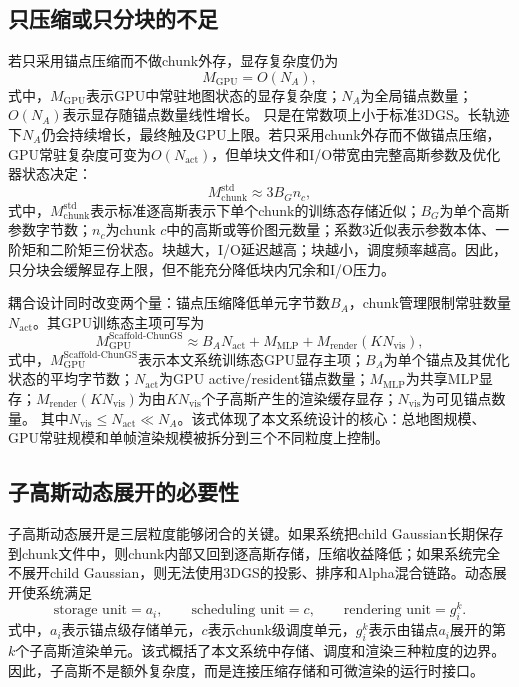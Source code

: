 \subsection{只压缩或只分块的不足}

若只采用锚点压缩而不做chunk外存，显存复杂度仍为
\begin{equation}
M_{\mathrm{GPU}}=O(N_A),
\end{equation}
式中，$M_{\mathrm{GPU}}$表示GPU中常驻地图状态的显存复杂度；$N_A$为全局锚点数量；$O(N_A)$表示显存随锚点数量线性增长。
只是在常数项上小于标准3DGS。长轨迹下$N_A$仍会持续增长，最终触及GPU上限。若只采用chunk外存而不做锚点压缩，GPU常驻复杂度可变为$O(N_{\mathrm{act}})$，但单块文件和I/O带宽由完整高斯参数及优化器状态决定：
\begin{equation}
M_{\mathrm{chunk}}^{\mathrm{std}}
\approx
3B_G n_c,
\end{equation}
式中，$M_{\mathrm{chunk}}^{\mathrm{std}}$表示标准逐高斯表示下单个chunk的训练态存储近似；$B_G$为单个高斯参数字节数；$n_c$为chunk $c$中的高斯或等价图元数量；系数3近似表示参数本体、一阶矩和二阶矩三份状态。块越大，I/O延迟越高；块越小，调度频率越高。因此，只分块会缓解显存上限，但不能充分降低块内冗余和I/O压力。

耦合设计同时改变两个量：锚点压缩降低单元字节数$B_A$，chunk管理限制常驻数量$N_{\mathrm{act}}$。其GPU训练态主项可写为
\begin{equation}
M_{\mathrm{GPU}}^{\mathrm{Scaffold\text{-}ChunGS}}
\approx
B_A N_{\mathrm{act}}
+
M_{\mathrm{MLP}}
+
M_{\mathrm{render}}(KN_{\mathrm{vis}}),
\end{equation}
式中，$M_{\mathrm{GPU}}^{\mathrm{Scaffold\text{-}ChunGS}}$表示本文系统训练态GPU显存主项；$B_A$为单个锚点及其优化状态的平均字节数；$N_{\mathrm{act}}$为GPU active/resident锚点数量；$M_{\mathrm{MLP}}$为共享MLP显存；$M_{\mathrm{render}}(KN_{\mathrm{vis}})$为由$K N_{\mathrm{vis}}$个子高斯产生的渲染缓存显存；$N_{\mathrm{vis}}$为可见锚点数量。
其中$N_{\mathrm{vis}}\leq N_{\mathrm{act}}\ll N_A$。该式体现了本文系统设计的核心：总地图规模、GPU常驻规模和单帧渲染规模被拆分到三个不同粒度上控制。

\subsection{子高斯动态展开的必要性}

子高斯动态展开是三层粒度能够闭合的关键。如果系统把child Gaussian长期保存到chunk文件中，则chunk内部又回到逐高斯存储，压缩收益降低；如果系统完全不展开child Gaussian，则无法使用3DGS的投影、排序和Alpha混合链路。动态展开使系统满足
\begin{equation}
\text{storage unit}=a_i,\qquad
\text{scheduling unit}=c,\qquad
\text{rendering unit}=g_i^k.
\end{equation}
式中，$a_i$表示锚点级存储单元，$c$表示chunk级调度单元，$g_i^k$表示由锚点$a_i$展开的第$k$个子高斯渲染单元。该式概括了本文系统中存储、调度和渲染三种粒度的边界。
因此，子高斯不是额外复杂度，而是连接压缩存储和可微渲染的运行时接口。

